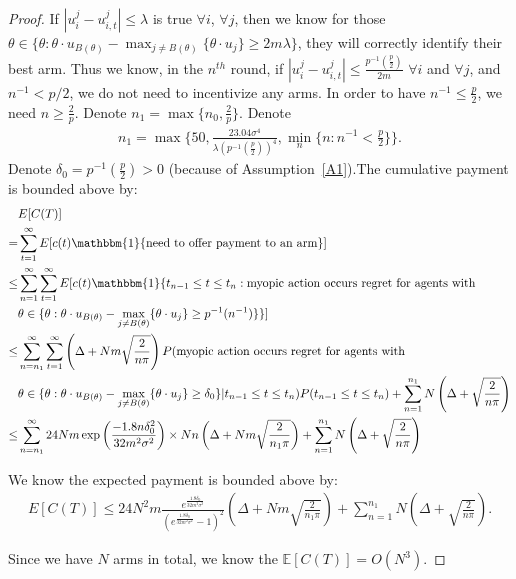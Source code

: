 \documentclass{article}
\begin{document}
\begin{proof}
If $|u_{i}^{j}-u_{i,t}^{j}|\leq \lambda$ is true $\forall i$, $\forall j$, then we know for those $\theta\in \{\theta:\theta\cdot u_{B(\theta)}-\max_{j\neq B(\theta)}\{\theta \cdot u_{j}\}\geq 2m\lambda\}$, they will correctly identify their best arm. Thus we know, in the $n^{th}$ round, if $|u_{i}^{j}-u_{i,t}^{j}|\leq \frac{p^{-1}(\frac{p}{2})}{2m}$ $\forall i$ and $\forall j$, and $n^{-1}<p/2$, we do not need to incentivize any arms. In order to have $n^{-1}\leq \frac{p}{2}$, we need $n\geq \frac{2}{p}$. Denote $n_1=\max\{n_{0}, \frac{2}{p}\}$. Denote 
\begin{align}
n_{1}=\max\bigg\{50, \frac{23.04\sigma^4}{\lambda\left(p^{-1}(\frac{p}{2})\right)^4},\min_{n}\{n:n^{-1}<\frac{p}{2}\}\bigg\}. \nonumber
\end{align}
Denote $\delta_{0}=p^{-1}(\frac{p}{2})>0$ (because of Assumption~\ref{A1}).The cumulative payment is bounded above by:
\begin{align}
&E[C(T)] \nonumber \\
= & \sum_{t=1}^{\infty}E[c(t)\mathbbm{1}\{\text{need to offer payment to an arm}\}] \nonumber \\
\leq &\sum_{n=1}^{\infty}\sum_{t=1}^{\infty}E[c(t)\mathbbm{1}\{t_{n-1}\leq t\leq t_{n}: \text{myopic action occurs regret for agents with } \nonumber \\
&\theta\in \{\theta:\theta\cdot u_{B(\theta)}-\max_{j\neq B(\theta)}\{\theta \cdot u_{j}\}\geq p^{-1}(n^{-1})\}\}] \nonumber \\
\leq &\sum_{n=n_{1}}^{\infty}\sum_{t=1}^{\infty}\left(\Delta+Nm\sqrt{\frac{2}{n\pi}}\right)P(\text{myopic action occurs regret for agents with }\nonumber \\
&\theta\in \{\theta:\theta\cdot u_{B(\theta)}-\max_{j\neq B(\theta)}\{\theta \cdot u_{j}\}\geq \delta_{0}\}|t_{n-1}\leq t\leq t_{n})P(t_{n-1}\leq t\leq t_{n})+\sum_{n=1}^{n_1}N\left(\Delta+\sqrt{\frac{2}{n\pi}}\right) \nonumber \\
\leq & \sum_{n=n_{1}}^{\infty}24Nm \exp\left(\frac{-1.8 n\delta_{0}^2}{32m^2\sigma^2}\right)\times Nn\left(\Delta+Nm\sqrt{\frac{2}{n_1\pi}}\right)+\sum_{n=1}^{n_1}N\left(\Delta+\sqrt{\frac{2}{n\pi}}\right) \nonumber 
\end{align}

We know the expected payment is bounded above by:
\begin{align}
E[C(T)] \leq 24N^2 m \frac{e^{\frac{1.8\delta_{0}}{32m^2\sigma^2}}}{(e^{\frac{1.8\delta_{0}}{32m^2\sigma^2}}-1)^2}\left(\Delta+Nm\sqrt{\frac{2}{n_1\pi}}\right)+\sum_{n=1}^{n_1}N\left(\Delta+\sqrt{\frac{2}{n\pi}}\right). \nonumber
\end{align}

Since we have $N$ arms in total, we know the $\mathbb{E}[C(T)]=O(N^3)$.
\end{proof}
\end{document}
